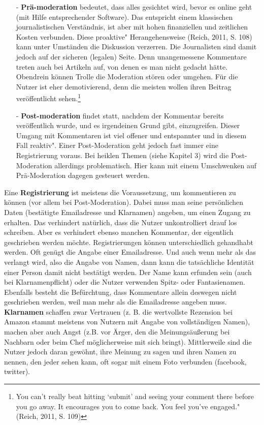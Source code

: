 \begin{itemize}
\item[-] {\bf Prä-moderation} bedeutet, dass alles gesichtet wird, bevor es online geht (mit Hilfe entsprechender Software). Das entspricht einem klassischen journalistischen Verständnis, ist aber mit hohen finanziellen und zeitlichen Kosten verbunden. Diese \glqq proaktive" Herangehensweise (Reich, 2011, S. 108) kann unter Umständen die Diskussion verzerren. Die Journalisten sind damit jedoch auf der sicheren (legalen) Seite. Denn unangemessene Kommentare treten auch bei Artikeln auf, von denen es man nicht gedacht hätte. Obendrein können \glqq Trolle\grqq\- die Moderation stören oder umgehen. Für die Nutzer ist  eher demotivierend, denn die meisten wollen ihren Beitrag veröffentlicht sehen.\footnote{\glqq You can’t really beat hitting ‘submit’ and seeing your comment there before you go
away. It encourages you to come back. You feel you’ve engaged." (Reich, 2011, S. 109)}
\item[-] {\bf Post-moderation} findet statt, nachdem der Kommentar bereits veröffentlich wurde, und es irgendeinen Grund gibt, einzugreifen. Dieser Umgang mit Kommentaren ist viel offener und entspannter und in diesem Fall \glqq reaktiv". Einer Post-Moderation geht jedoch fast immer eine Registrierung voraus. Bei heiklen Themen (siehe Kapitel 3) wird die Post-Moderation allerdings problematisch. Hier kann mit einem Umschwenken auf Prä-Moderation dagegen gesteuert werden.
\end{itemize}
Eine {\bf Registrierung} ist meistens die Voraussetzung, um kommentieren zu können (vor allem bei Post-Moderation). Dabei muss man seine persönlichen Daten (be\-stä\-tig\-te Emailadresse und Klarnamen) angeben, um einen Zugang zu erhalten. Das verhindert natürlich, dass die Nutzer unkontrolliert drauf los schreiben. Aber es verhindert ebenso manchen Kommentar, der eigentlich geschrieben werden möchte. 
Registrierungen können unterschiedlich gehandhabt werden. Oft genügt die Angabe einer Emailadresse. Und auch wenn mehr als das verlangt wird, also die Angabe von Namen, dann kann die tatsächliche Identität einer Person damit nicht bestätigt werden. Der Name kann erfunden sein (auch bei Klarnamenpflicht) oder die Nutzer verwenden Spitz- oder Fantasienamen. Ebenfalls besteht die Befürchtung, dass Kommentare allein deswegen nicht geschrieben werden, weil man mehr als die Emailadresse angeben muss. 
{\bf Klarnamen} schaffen zwar Vertrauen (z. B. die wertvollste Rezension bei Amazon stammt meistens von Nutzern mit Angabe von vollständigen Namen), machen aber auch Angst (z.B. vor Ärger, den die Meinungsäußerung bei Nachbarn oder beim Chef möglicherweise mit sich bringt). Mittlerweile sind die Nutzer jedoch daran gewöhnt, ihre Meinung zu sagen und ihren Namen zu nennen, den jeder sehen kann, oft sogar mit einem Foto verbunden (facebook, twitter). 


